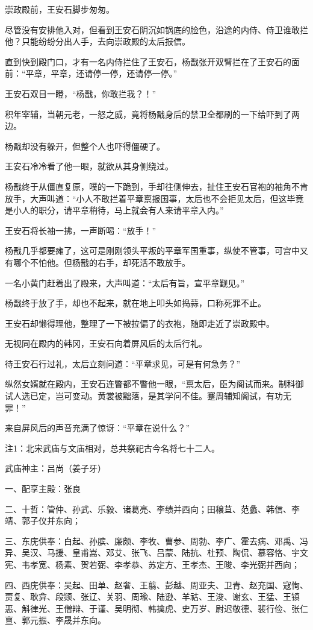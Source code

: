崇政殿前，王安石脚步匆匆。

尽管没有安排他入对，但看到王安石阴沉如锅底的脸色，沿途的内侍、侍卫谁敢拦他？只能纷纷分出人手，去向崇政殿的太后报信。

直到快到殿门口，才有一名内侍拦住了王安石，杨戬张开双臂拦在了王安石的面前：“平章，平章，还请停一停，还请停一停。”

王安石双目一瞪，“杨戬，你敢拦我？！”

积年宰辅，当朝元老，一怒之威，竟将杨戬身后的禁卫全都刷的一下给吓到了两边。

杨戬却没有躲开，但整个人也吓得僵硬了。

王安石冷冷看了他一眼，就欲从其身侧绕过。

杨戬终于从僵直复原，噗的一下跪到，手却往侧伸去，扯住王安石官袍的袖角不肯放手，大声叫道：“小人不敢拦着平章禀报国事，太后也不会拒见太后，但这毕竟是小人的职分，请平章稍待，马上就会有人来请平章入内。”

王安石将长袖一拂，一声断喝：“放手！”

杨戬几乎都要瘫了，这可是刚刚领头平叛的平章军国重事，纵使不管事，可宫中又有哪个不怕他。但杨戬的右手，却死活不敢放手。

一名小黄门赶着出了殿来，大声叫道：“太后有旨，宣平章觐见。”

杨戬终于放了手，却也不起来，就在地上叩头如捣蒜，口称死罪不止。

王安石却懒得理他，整理了一下被拉偏了的衣袍，随即走近了崇政殿中。

无视同在殿内的韩冈，王安石向着屏风后的太后行礼。

待王安石行过礼，太后立刻问道：“平章求见，可是有何急务？”

纵然女婿就在殿内，王安石连瞥都不瞥他一眼，“禀太后，臣为阁试而来。制科御试人选已定，岂可变动。黄裳被黜落，是其学问不佳。蹇周辅知阁试，有功无罪！”

来自屏风后的声音充满了惊讶：“平章在说什么？”

注1：北宋武庙与文庙相对，总共祭祀古今名将七十二人。

武庙神主：吕尚（姜子牙）

一、配享主殿：张良

二、十哲：管仲、孙武、乐毅、诸葛亮、李绩并西向；田穣苴、范蠡、韩信、李靖、郭子仪并东向；

三、东庑供奉：白起、孙膑、廉颇、李牧、曹参、周勃、李广、霍去病、邓禹、冯异、吴汉、马援、皇甫嵩、邓艾、张飞、吕蒙、陆抗、杜预、陶侃、慕容恪、宇文宪、韦孝宽、杨素、贺若弼、李孝恭、苏定方、王孝杰、王晙、李光弼并西向；

四、西庑供奉：吴起、田单、赵奢、王翦、彭越、周亚夫、卫青、赵充国、寇恂、贾复、耿弇、段颎、张辽、关羽、周瑜、陆逊、羊祜、王浚、谢玄、王猛、王镇恶、斛律光、王僧辩、于谨、吴明彻、韩擒虎、史万岁、尉迟敬德、裴行俭、张仁亶、郭元振、李晟并东向。
